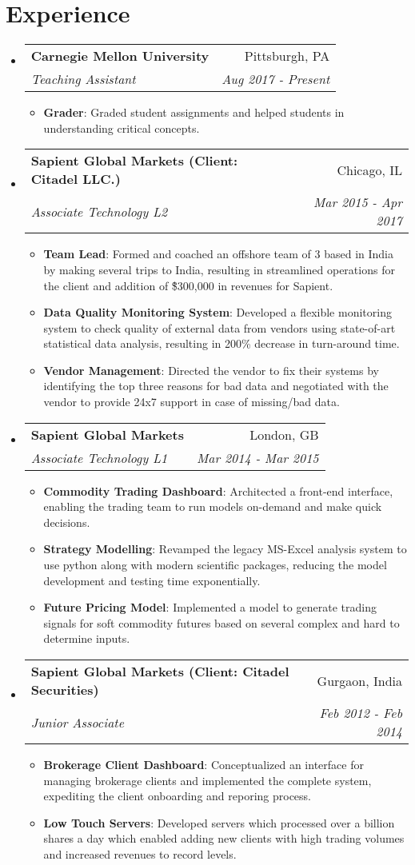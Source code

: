 \documentclass[letterpaper,10.8pt]{article}
\makeatletter
\newcommand{\resumeItem}[2]{
  \item\small{
    \textbf{#1}{: #2 \vspace{-2pt}}
  }
}
\newcommand{\resumeSubheading}[4]{
  \vspace{-1pt}\item
    \begin{tabular*}{0.97\textwidth}{l@{\extracolsep{\fill}}r}
      \textbf{#1} & #2 \\
      \textit{\small#3} & \textit{\small #4} \\
    \end{tabular*}\vspace{-5pt}
}
\newcommand{\resumeSubHeadingListStart}{\begin{itemize}[leftmargin=*]}
\newcommand{\resumeSubHeadingListEnd}{\end{itemize}}
\newcommand{\resumeItemListStart}{\begin{itemize}}
\newcommand{\resumeItemListEnd}{\end{itemize}\vspace{-5pt}}
\makeatother
\begin{document}
\section{Experience}
  \resumeSubHeadingListStart
	 \resumeSubheading
	{Carnegie Mellon University}{Pittsburgh, PA}
	{Teaching Assistant}{Aug 2017 -  Present}
	\resumeItemListStart
	\resumeItem{Grader}
	{Graded student assignments and helped students in understanding critical concepts.}
	\resumeItemListEnd
	
    \resumeSubheading
      {Sapient Global Markets (Client: Citadel LLC.)}{Chicago, IL}
      {Associate Technology L2}{Mar 2015 - Apr 2017}
      \resumeItemListStart
        \resumeItem{Team Lead}
          {Formed and coached an offshore team of 3 based in India by making several trips to India, resulting in streamlined operations for the client and addition of \~\$300,000 in revenues for Sapient.}
          \resumeItem{Data Quality Monitoring System}
          {Developed a flexible monitoring system to check quality of external data from vendors using state-of-art statistical data analysis, resulting in 200\% decrease in turn-around time.}
          \resumeItem{Vendor Management}{Directed the vendor to fix their systems by identifying the top three reasons for bad data and negotiated with the vendor to provide 24x7 support in case of missing/bad data.}
      \resumeItemListEnd

    \resumeSubheading
	{Sapient Global Markets}{London, GB}
	{Associate Technology L1}{Mar 2014 - Mar 2015}
    \resumeItemListStart
    \resumeItem{Commodity Trading Dashboard}
    {Architected a front-end interface, enabling the trading team to run models on-demand and make quick decisions.}
    \resumeItem{Strategy Modelling}
    {Revamped the legacy MS-Excel analysis system to use python along with modern scientific packages, reducing the model development and testing time exponentially.}
    \resumeItem{Future Pricing Model}{Implemented a model to generate trading signals for soft commodity futures based on several complex and hard to determine inputs.}
    \resumeItemListEnd

    \resumeSubheading
    {Sapient Global Markets (Client: Citadel Securities)}{Gurgaon, India}
    {Junior Associate}{Feb 2012 - Feb 2014}
    \resumeItemListStart
    \resumeItem{Brokerage Client Dashboard}
    {Conceptualized an interface for managing brokerage clients and implemented the complete system, expediting the client onboarding and reporing process.}
    \resumeItem{Low Touch Servers}{Developed servers which processed over a billion shares a day which enabled adding new clients with high trading volumes and increased revenues to record levels.}
    \resumeItemListEnd
\resumeSubHeadingListEnd
\end{document}

